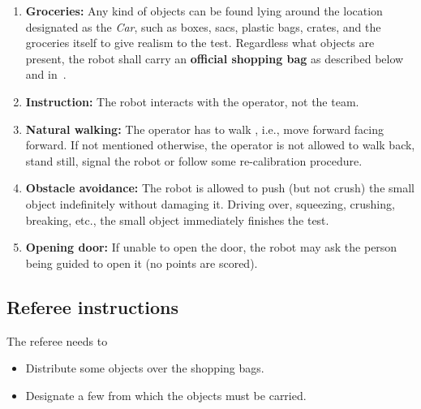 \begin{enumerate}
  \item \textbf{Groceries:} Any kind of objects can be found lying around the location designated as the \textit{Car}, such as boxes, sacs, plastic bags, crates, and the groceries itself to give realism to the test. Regardless what objects are present, the robot shall carry an \textbf{official shopping bag} as described below and in~.

  \item \textbf{Instruction:} The robot interacts with the operator, not the team.

  \item \textbf{Natural walking:} The operator has to walk , i.e., move forward facing forward. If not mentioned otherwise, the operator is not allowed to walk back, stand still, signal the robot or follow some re-calibration procedure.

  \item \textbf{Obstacle avoidance:} The robot is allowed to push (but not crush) the small object indefinitely without damaging it.
  Driving over, squeezing, crushing, breaking, etc., the small object immediately finishes the test.

  \item \textbf{Opening door:} If unable to open the door, the robot may ask the person being guided to open it (no points are scored).

\end{enumerate}


\subsection{Referee instructions}

The referee needs to
\begin{itemize}
  \item Distribute some objects over the shopping bags.
  \item Designate a few  from which the objects must be carried.
\end{itemize}


